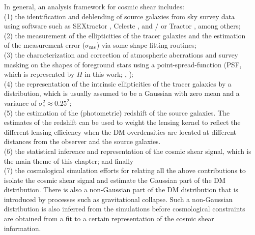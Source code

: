 In general, an analysis framework for cosmic shear includes: \\ 
(1) the identification and deblending of source galaxies from sky survey data 
using software such as {\sc SEXtractor} \citep{Bertin1996}, {\sc Celeste}
\citep{Regier2014}, and / or {\sc Tractor} \citep{Lang2010}, among others;\\
(2) the measurement of the ellipticities of the tracer galaxies  
and the estimation of the measurement error ($\sigma_{\rm
ms}$) via some shape fitting routines; \\
(3) the characterization and correction of atmospheric aberrations and survey masking 
on the shapes of foreground stars using
 a point-spread-function (PSF, which is represented by $\Pi$ in this work; \citealt{Jee2013a}, \citealt{Rowe2010}); \\
(4) the representation of the intrinsic ellipticities of the tracer galaxies by a
distribution, which is usually assumed to be a Gaussian with zero mean
and a variance of $\sigma_e^2 \approx 0.25^2$;\\ 
(5) the estimation of the (photometric) redshift of the source galaxies. The 
estimates of the redshift can be used to weight the lensing kernel
to reflect the different lensing efficiency when the DM overdensities 
are located at different distances from the observer and the source galaxies.
\\
(6) the statistical inference and representation of the cosmic shear signal,
which is the main theme of this chapter;
and finally \\ 
(7) the cosmological simulation efforts for relating all the above contributions to isolate the cosmic shear signal and
estimate the Gaussian part of the DM distribution. 
There is also a non-Gaussian part of the DM distribution that is introduced by processes
such as gravitational collapse. Such a non-Gaussian distribution 
is also inferred from the simulations before    
cosmological constraints are obtained from a fit to a certain representation of
the cosmic shear information. 

